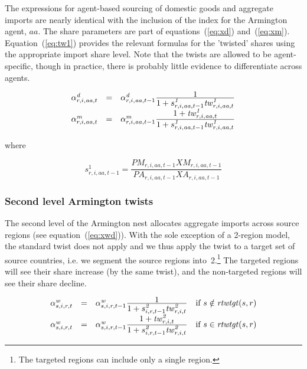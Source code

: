 \documentclass[11pt,letterpaper]{report}
\begin{document}
The expressions for agent-based sourcing of domestic goods and aggregate imports
are nearly identical with the inclusion of the index for the Armington agent,
$\mathit{aa}$. The share parameters are part of equations~(\ref{eq:xd})
and~(\ref{eq:xm}). Equation~(\ref{eq:tw1}) provides the relevant formulas for
the 'twisted' shares using the appropriate import share level. Note that the
twists are allowed to be agent-specific, though in practice, there is probably
little evidence to differentiate across agents.

\begin{equation}
\label{eq:tw1}
\begin{array}{c c l}
\alpha^{\mathit{d}}_{r,i,\mathit{aa},t} & = &
   \alpha^{\mathit{d}}_{r,i,\mathit{aa},t-1}
   \frac{\displaystyle 1}{\displaystyle 1+s^{\mathit{1}}_{r,i,\mathit{aa},t-1}
      \mathit{tw}^{\mathit{1}}_{r,i,\mathit{aa},t}} \\
\alpha^{\mathit{m}}_{r,i,\mathit{aa},t} & = &
   \alpha^{\mathit{m}}_{r,i,\mathit{aa},t-1}
   \frac{\displaystyle 1+\mathit{tw}^{\mathit{1}}_{r,i,\mathit{aa},t}}
   {\displaystyle 1+s^{\mathit{1}}_{r,i,\mathit{aa},t-1}
      \mathit{tw}^{\mathit{1}}_{r,i,\mathit{aa},t}} \\
\end{array}
\end{equation}

\noindent where

\[
s^{\mathit{1}}_{r,i,\mathit{aa},t-1} =
   \frac{\mathit{PM}_{r,i,\mathit{aa},t-1}\mathit{XM}_{r,i,\mathit{aa},t-1}}
   {\mathit{PA}_{r,i,\mathit{aa},t-1}\mathit{XA}_{r,i,\mathit{aa},t-1}}
\]

\subsubsection{Second level Armington twists}

The second level of the Armington nest allocates aggregate imports across source
regions (see equation~(\ref{eq:xwd})). With the sole exception of a 2-region
model, the standard twist does not apply and we thus apply the twist to a target
set of source countries, i.e. we segment the source regions
into~2.\footnote{The targeted regions can include only a single region.} The
targeted regions will see their share increase (by the same twist), and the
non-targeted regions will see their share decline.

\begin{equation}
\label{eq:tw2}
\begin{array}{c c l l}
\alpha^{\mathit{w}}_{s,i,r,t} & = &
   \alpha^{\mathit{w}}_{s,i,r,t-1}
   \frac{\displaystyle 1}{\displaystyle 1+s^{\mathit{2}}_{i,r,t-1}
      \mathit{tw}^{\mathit{2}}_{r,i,t}}
&  \textrm{if } s \notin {\mathit{rtwtgt}(s,r)}\\
\alpha^{\mathit{w}}_{s,i,r,t} & = &
   \alpha^{\mathit{w}}_{s,i,r,t-1}
   \frac{\displaystyle 1+\mathit{tw}^{\mathit{2}}_{r,i,t}}
      {\displaystyle 1+s^{\mathit{2}}_{i,r,t-1} \mathit{tw}^{\mathit{2}}_{r,i,t}}
&  \textrm{if } s \in {\mathit{rtwtgt}(s,r)} \\
\end{array}
\end{equation}
\end{document}
